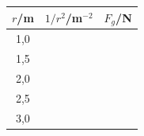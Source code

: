 \documentclass[11pt,a4paper]{article}
\begin{document}
	\begin{table}[H]
		
		\centering
		
		\renewcommand{\arraystretch}{1.45}
		
		\begin{tabular}{c|c|c}
			
			\toprule
			
			$r$/m
			&
			$1/r^2$/m$^{-2}$
			&
			$F_g$/N
			
			\\
			
			\midrule
			
			1,0 & & \\
			
			1,5 & & \\
			
			2,0 & & \\
			
			2,5 & & \\
			
			3,0 & & \\
			
			\bottomrule
			
		\end{tabular}
		
	\end{table}
	
\end{document}

